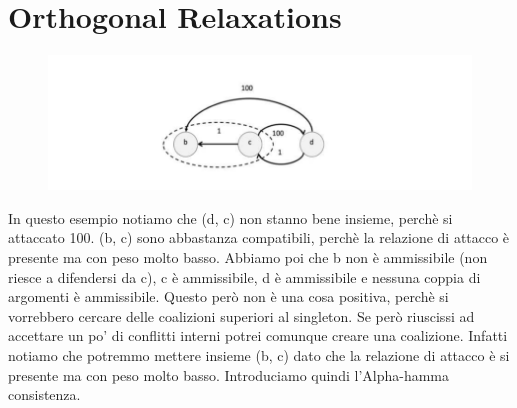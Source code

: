 \section{Orthogonal Relaxations}
\begin{figure}[htp]
	\centering
    \includegraphics[width=12cm, keepaspectratio]{img/Cap6/ortogonal.png}
\end{figure}
In questo esempio notiamo che (d, c) non stanno bene insieme, perchè si attaccato 100. (b, c) sono abbastanza compatibili, perchè la relazione di attacco è presente ma con peso molto basso. Abbiamo poi che b non è ammissibile (non riesce a difendersi da c), c è ammissibile, d è ammissibile e nessuna
coppia di argomenti è ammissibile. Questo però non è una cosa positiva, perchè si vorrebbero cercare delle coalizioni superiori al singleton. Se però riuscissi ad accettare un po’ di conflitti interni potrei comunque creare una coalizione. Infatti notiamo che potremmo mettere insieme (b, c) dato che
la relazione di attacco è si presente ma con peso molto basso. Introduciamo quindi l’Alpha-hamma consistenza.
\newpage
